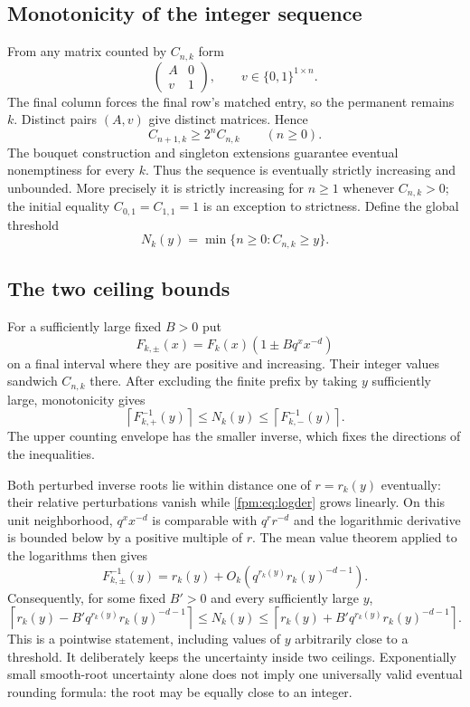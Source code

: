 \documentclass[11pt]{article}
\theoremstyle{definition}\newtheorem{definition}[theorem]{Definition}
\theoremstyle{remark}\newtheorem{remark}[theorem]{Remark}
\begin{document}
\subsection{Monotonicity of the integer sequence}
From any matrix counted by $C_{n,k}$ form
\[
 \begin{pmatrix}A&0\\v&1\end{pmatrix},\qquad v\in\{0,1\}^{1\times n}.
\]
The final column forces the final row's matched entry, so the permanent remains $k$. Distinct pairs $(A,v)$ give distinct matrices. Hence
\begin{equation}\label{fpm:eq:injection}
 C_{n+1,k}\ge2^nC_{n,k}\qquad(n\ge0).
\end{equation}
The bouquet construction and singleton extensions guarantee eventual nonemptiness for every $k$. Thus the sequence is eventually strictly increasing and unbounded. More precisely it is strictly increasing for $n\ge1$ whenever $C_{n,k}>0$; the initial equality $C_{0,1}=C_{1,1}=1$ is an exception to strictness. Define the global threshold
\begin{equation}\label{fpm:eq:threshold}
 N_k(y)=\min\{n\ge0:C_{n,k}\ge y\}.
\end{equation}

\subsection{The two ceiling bounds}
For a sufficiently large fixed $B>0$ put
\[
 F_{k,\pm}(x)=F_k(x)(1\pm Bq^xx^{-d})
\]
on a final interval where they are positive and increasing. Their integer values sandwich $C_{n,k}$ there. After excluding the finite prefix by taking $y$ sufficiently large, monotonicity gives
\begin{equation}\label{fpm:eq:ceilingenv}
 \left\lceil F_{k,+}^{-1}(y)\right\rceil
 \le N_k(y)\le
 \left\lceil F_{k,-}^{-1}(y)\right\rceil.
\end{equation}
The upper counting envelope has the smaller inverse, which fixes the directions of the inequalities.

Both perturbed inverse roots lie within distance one of $r=r_k(y)$ eventually: their relative perturbations vanish while \eqref{fpm:eq:logder} grows linearly. On this unit neighborhood, $q^xx^{-d}$ is comparable with $q^rr^{-d}$ and the logarithmic derivative is bounded below by a positive multiple of $r$. The mean value theorem applied to the logarithms then gives
\[
 F_{k,\pm}^{-1}(y)=r_k(y)+O_k(q^{r_k(y)}r_k(y)^{-d-1}).
\]
Consequently, for some fixed $B'>0$ and every sufficiently large $y$,
\begin{equation}\label{fpm:eq:ceilingprecise}
 \left\lceil r_k(y)-B'q^{r_k(y)}r_k(y)^{-d-1}\right\rceil
 \le N_k(y)\le
 \left\lceil r_k(y)+B'q^{r_k(y)}r_k(y)^{-d-1}\right\rceil.
\end{equation}
This is a pointwise statement, including values of $y$ arbitrarily close to a threshold. It deliberately keeps the uncertainty inside two ceilings. Exponentially small smooth-root uncertainty alone does not imply one universally valid eventual rounding formula: the root may be equally close to an integer.
\end{document}
